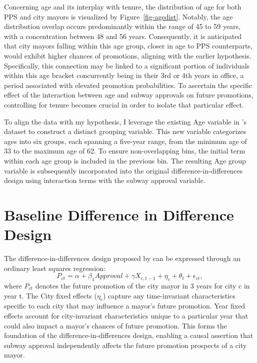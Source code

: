 \documentclass[12pt, ]{article}
\begin{document}
Concerning age and its interplay with tenure, the distribution of age
for both PPS and city mayors is visualized by Figure~\ref{fig-agedist}.
Notably, the age distribution overlap occurs predominantly within the
range of 45 to 59 years, with a concentration between 48 and 56 years.
Consequently, it is anticipated that city mayors falling within this age
group, closer in age to PPS counterparts, would exhibit higher chances
of promotions, aligning with the earlier hypothesis. Specifically, this
connection may be linked to a significant portion of individuals within
this age bracket concurrently being in their 3rd or 4th years in office,
a period associated with elevated promotion probabilities. To ascertain
the specific effect of the interaction between age and subway approvals
on future promotions, controlling for tenure becomes crucial in order to
isolate that particular effect.

To align the data with my hypothesis, I leverage the existing Age
variable in \citet{lei2022private}'s dataset to construct a distinct
grouping variable. This new variable categorizes ages into six groups,
each spanning a five-year range, from the minimum age of 33 to the
maximum age of 62. To ensure non-overlapping bins, the initial term
within each age group is included in the previous bin. The resulting Age
group variable is subsequently incorporated into the original
difference-in-differences design using interaction terms with the subway
approval variable.

\hypertarget{baseline-difference-in-difference-design}{%
\section{Baseline Difference in Difference
Design}\label{baseline-difference-in-difference-design}}

The difference-in-differences design proposed by \citet{lei2022private}
can be expressed through an ordinary least squares regression:
\[P_{ct} = \alpha + \beta_{1}Approval + \gamma X_{c,t - 1} + \eta_{c} + \theta_{t} + \epsilon_{ct},\]
where \(P_{ct}\) denotes the future promotion of the city mayor in 3
years for city c in year t. The City fixed effects (\(\eta_{c}\))
capture any time-invariant characteristics specific to each city that
may influence a mayor's future promotion. Year fixed effects account for
city-invariant characteristics unique to a particular year that could
also impact a mayor's chances of future promotion. This forms the
foundation of the difference-in-differences design, enabling a causal
assertion that subway approval independently affects the future
promotion prospects of a city mayor.
\end{document}
